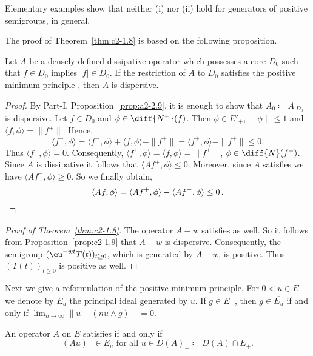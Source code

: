 \begin{remark*}\label{rem:c2-1.8-Claude}
%
Elementary examples show that neither \upshape(i) nor \upshape(ii) hold for generators of positive semigroups, in general.
\end{remark*}
The proof of Theorem~\ref{thm:c2-1.8}   is based on the following proposition.
\begin{proposition}\label{prop:c2-1.9}
%
Let $A$ be a densely defined dissipative operator which possesses a core $D_{0}$ such that $f \in D_{0}$ implies $|f| \in D_{0}$.
If the restriction of\/ $A$ to $D_{0}$ satisfies the positive minimum principle , then $A$ is dispersive.
\end{proposition}
\begin{proof}%
By Part-I, Proposition~\ref{prop:a2-2.9}, it is enough to show that $A_{0} \coloneqq A_{\vert D_{0}}$ is dispersive.
Let $f \in D_{0}$ and $\phi \in \diff{N^{+}}(f)$.
Then $\phi \in E'_{+}$, $\|\phi\| \leq 1$ and $\langle f,\phi \rangle = \|f^{+}\|$.
Hence, 
%
\[
	\langle f^{-},\phi \rangle = \langle f^{-},\phi \rangle + \langle f,\phi \rangle - \|f^{+}\| = \langle f^{+},\phi \rangle - \|f^{+}\| \leq 0 .
\]
%
Thus $\langle f^{-},\phi \rangle = 0$.
Consequently, $\langle f^{+},\phi \rangle = \langle f,\phi \rangle = \|f^{+}\|$, \ie $\phi \in \diff{N}(f^{+})$.
Since $A$ is dissipative it follows that $\langle Af^{+},\phi \rangle \leq 0$.
Moreover, since $A$ satisfies  we have $\langle Af^{-},\phi \rangle \geq 0$.
So we finally obtain, 
\[
\langle Af,\phi \rangle = \langle Af^{+},\phi \rangle - \langle Af^{-},\phi \rangle \leq 0\,.
\qedhere
\]
\end{proof}
\begin{proof}[Proof of Theorem~\ref{thm:c2-1.8}]
%
The operator $A - w$ satisfies  
as well.
So it follows from Proposition~\ref{prop:c2-1.9}   that $A - w$ is dispersive.
Consequently, the semigroup\/ $(\eu^{-wt}T(t))_{t \geq 0}$, which is generated by $A - w$, is positive.
Thus $(T(t))_{t \geq 0}$ is positive as well.
\end{proof}
Next we give a reformulation of the positive minimum principle.
For $0 < u \in E_{+}$ we denote by $E_{u}$ the principal ideal generated by $u$.
If\/ $g \in E_{+}$, then $g \in \overline{E_{u}}$ if and only if\/ $\lim_{n \to \infty} \|u - (n u \wedge g)\| = 0$.
\begin{lemma}\label{lem:c2-1.10}
%
An operator $A$ on $E$ satisfies  if and only if
\begin{equation}\label{eq:c2-1.8}
(Au)^{-} \in E_{u} \text{ for all } u \in D(A)_{+} \coloneqq D(A) \cap E_{+}.
\end{equation}
\end{lemma}

